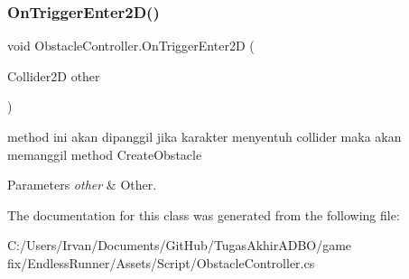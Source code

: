 \subsubsection{\texorpdfstring{On\+Trigger\+Enter2\+D()}{OnTriggerEnter2D()}}
{\footnotesize\ttfamily void Obstacle\+Controller.\+On\+Trigger\+Enter2D (\begin{DoxyParamCaption}\item[{Collider2D}]{other }\end{DoxyParamCaption})\hspace{0.3cm}{\ttfamily [private]}}



method ini akan dipanggil jika karakter menyentuh collider maka akan memanggil method Create\+Obstacle 


\begin{DoxyParams}{Parameters}
{\em other} & Other.\\
\hline
\end{DoxyParams}


The documentation for this class was generated from the following file\+:\begin{DoxyCompactItemize}
\item 
C\+:/\+Users/\+Irvan/\+Documents/\+Git\+Hub/\+Tugas\+Akhir\+A\+D\+B\+O/game fix/\+Endless\+Runner/\+Assets/\+Script/Obstacle\+Controller.\+cs\end{DoxyCompactItemize}
